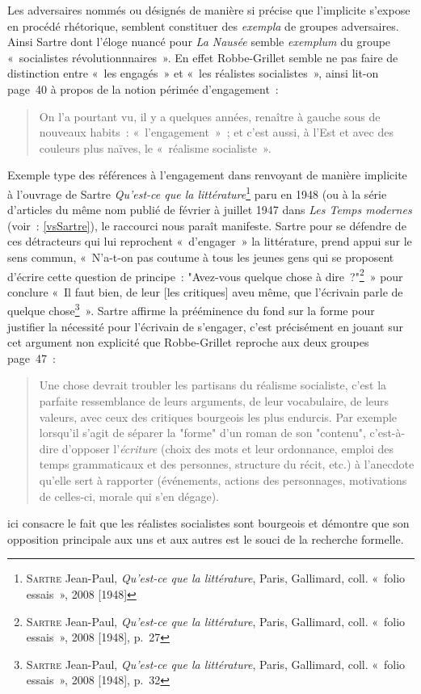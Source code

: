 \documentclass[12pt, a4paper]{article}
\begin{document}
Les adversaires nommés ou désignés de manière si précise que l'implicite s'expose en procédé rhétorique, semblent constituer des \textit{exempla} de groupes adversaires. Ainsi Sartre dont l'éloge nuancé pour \textit{La Nausée} semble \textit{exemplum} du groupe «~socialistes révolutionnnaires~». En effet Robbe-Grillet semble ne pas faire de distinction entre «~les engagés~» et «~les réalistes socialistes~», ainsi lit-on page~40 à propos de la notion périmée d'engagement~:
\begin{quote}
    On l’a pourtant vu, il y a quelques années, renaître à gauche sous de nouveaux habits~: «~l’engagement~»~; et c’est aussi, à l’Est et avec des couleurs plus naïves, le «~réalisme socialiste~».
\end{quote}
Exemple type des références à l'engagement dans \punr{} renvoyant de manière implicite à l'ouvrage de Sartre \textit{Qu'est-ce que la littérature}\footnote{\textsc{Sartre} Jean-Paul, \textit{Qu'est-ce que la littérature}, Paris, Gallimard, coll. «~folio essais~», 2008 [1948]} paru en 1948 (ou à la série d'articles du même nom publié de février à juillet 1947 dans \textit{Les Temps modernes} (voir~: \ref{vsSartre}), le raccourci nous paraît manifeste. Sartre pour se défendre de ces détracteurs qui lui reprochent «~d'engager~» la littérature, prend appui sur le sens commun, «~N'a-t-on pas coutume à tous les jeunes gens qui se proposent d'écrire cette question de principe~: "Avez-vous quelque chose à dire~?"\footnote{\textsc{Sartre} Jean-Paul, \textit{Qu'est-ce que la littérature}, Paris, Gallimard, coll. «~folio essais~», 2008 [1948], p.~27}~» pour conclure «~Il faut bien, de leur [les critiques] aveu même, que l'écrivain parle de quelque chose\footnote{\textsc{Sartre} Jean-Paul, \textit{Qu'est-ce que la littérature}, Paris, Gallimard, coll. «~folio essais~», 2008 [1948], p.~32}~». Sartre affirme la prééminence du fond sur la forme pour justifier la nécessité pour l'écrivain de s'engager, c'est précisément en jouant sur cet argument non explicité que Robbe-Grillet reproche aux deux groupes page~47~:
\begin{quote}
    Une chose devrait troubler les partisans du réalisme socialiste, c'est la parfaite ressemblance de leurs arguments, de leur vocabulaire, de leurs valeurs, avec ceux des critiques bourgeois les plus endurcis. Par exemple lorsqu'il s'agit de séparer la "forme" d'un roman de son "contenu", c'est-à-dire d'opposer l'\textit{écriture} (choix des mots et leur ordonnance, emploi des temps grammaticaux et des personnes, structure du récit, etc.) à l'anecdote qu'elle sert à rapporter (événements, actions des personnages, motivations de celles-ci, morale qui s'en dégage).
\end{quote}
\robbe{} ici consacre le fait que les réalistes socialistes sont bourgeois et démontre que son opposition principale aux uns et aux autres est le souci de la recherche formelle.
\end{document}
